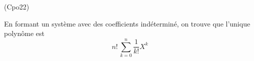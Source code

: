 \begin{tiny}(Cpo22)\end{tiny} En formant un système avec des coefficients indéterminé, on trouve que l'unique polynôme est
\begin{displaymath}
 n!\,\sum_{k=0}^n\frac{1}{k!}X^k
\end{displaymath}
